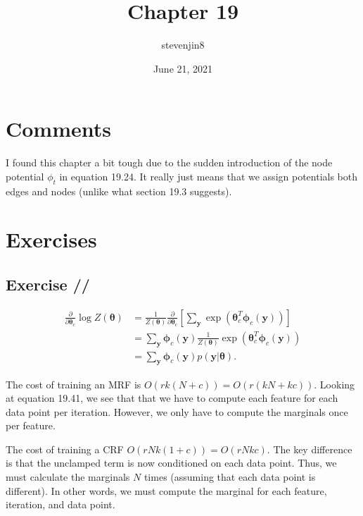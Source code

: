 \documentclass[a4paper,11pt]{article}
\title{Chapter 19}
\author{stevenjin8}
\date{June 21, 2021}
\newcounter{exercise}
\newcounter{subexercise}
\newcommand*{\exercise}[1][]{
  \subsection*{Exercise
    \ifx/#1/\stepcounter{exercise}\arabic{exercise}
    \else#1\fi
  }
  \setcounter{subexercise}{0}
}
\begin{document}
	\maketitle

	\section*{Comments}
	I found this chapter a bit tough due to the sudden introduction of the node potential $\phi_t$ in
	equation 19.24. It really just means that we assign potentials both edges and nodes (unlike what
	section 19.3 suggests).

	\section*{Exercises}
	\exercise
	\begin{align*}
		\frac\partial{ \partial\boldsymbol{\theta}_c } \log Z( \boldsymbol{\theta} ) &=
		\frac1{ Z( \boldsymbol{\theta} )} \frac\partial{ \partial\boldsymbol{\theta}_c } \left[
			\sum\limits_\mathbf{y} \exp \left(
				\boldsymbol{\theta}_c^T
				\boldsymbol{\phi}_c(\mathbf{y})
			\right)
		\right] \\
		&= \sum\limits_\mathbf{y}
		\boldsymbol{\phi}_c( \mathbf{y} ) \frac1{ Z( \boldsymbol{\theta} )}
		\exp \left(
			\boldsymbol{\theta}_c^T
			\boldsymbol{\phi}_c( \mathbf{y} )
		\right) \\
		&= \sum\limits_\mathbf{y}
		\boldsymbol{\phi}_c( \mathbf{y} ) p( \mathbf{y} | \boldsymbol{\theta} ).
	\end{align*}

	\setcounter{exercise}{3}
	The cost of training an MRF is $O(rk(N+c)) = O(r(kN + kc))$. Looking at equation 19.41, we see that
	that we have to compute each feature for each data point per iteration. However, we only have to
	compute the marginals once per feature.

	The cost of training a CRF $O(rNk(1+c)) = O(rNkc)$. The key difference is that the unclamped term
	is now conditioned on each data point. Thus, we must calculate the marginals $N$ times (assuming
	that each data point is different). In other words, we must compute the marginal for each
	feature, iteration, and data point.
\end{document}
